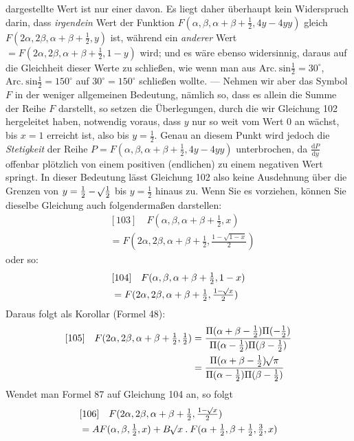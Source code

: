 dargestellte Wert ist nur einer davon. Es liegt daher überhaupt kein Widerspruch darin, dass \textit{irgendein} Wert der Funktion $F(\alpha,\beta,\alpha+\beta+\frac12,4y-4yy)$ gleich $F(2\alpha,2\beta,\alpha+\beta+\frac12,y)$ ist, während ein \textit{anderer} Wert $=F(2\alpha,2\beta,\alpha+\beta+\frac12,1-y)$ wird; und es wäre ebenso widersinnig, daraus auf die Gleichheit dieser Werte zu schließen, wie wenn man aus $\mathrm{Arc.\ sin}\frac12=30^\circ$, $\mathrm{Arc.\ sin}\frac12=150^\circ$ auf $30^\circ=150^\circ$ schließen wollte. --- Nehmen wir aber das Symbol $F$ in der weniger allgemeinen Bedeutung, nämlich so, dass es allein die Summe der Reihe $F$ darstellt, so setzen die Überlegungen, durch die wir Gleichung 102 hergeleitet haben, notwendig voraus, dass $y$ nur so weit vom Wert 0 an wächst, bis $x=1$ erreicht ist, also bis $y=\frac12$. Genau an diesem Punkt wird jedoch die \textit{Stetigkeit} der Reihe $P=F(\alpha,\beta,\alpha+\beta+\frac12,4y-4yy)$ unterbrochen, da $\frac{\mathrm dP}{\mathrm dy}$ offenbar plötzlich von einem positiven (endlichen) zu einem negativen Wert springt. 
In dieser Bedeutung lässt Gleichung 102 also keine Ausdehnung über die Grenzen von $y=\frac12-\mathord{{}^{}\!\surd}\frac12$ bis $y=\frac12$ hinaus zu. Wenn Sie es vorziehen, können Sie dieselbe Gleichung auch folgendermaßen darstellen:
\[
\begin{aligned}&[103]\quad F(\alpha,\beta,\alpha+\beta+\tfrac12,x)\\&=F(2\alpha,2\beta,\alpha+\beta+\tfrac12,\tfrac{1-\sqrt{1-x}}2)\end{aligned}
\]
oder so:
\[
\begin{aligned}&[104]\quad F(\alpha,\beta,\alpha+\beta+\tfrac12,1-x)\\&=F(2\alpha,2\beta,\alpha+\beta+\tfrac12,\tfrac{1-\mathord{{}^{}\!\surd}x}2)\end{aligned}
\]
Daraus folgt als Korollar (Formel 48):
\[
\begin{aligned}
{}[105]\quad F(2\alpha,2\beta,\alpha+\beta+\tfrac12,\tfrac12)&=\frac{\Pi(\alpha+\beta-\tfrac12)\Pi(-\tfrac12)}{\Pi(\alpha-\tfrac12)\Pi(\beta-\tfrac12)}\\
&=\frac{\Pi(\alpha+\beta-\tfrac12)\mathord{{}^{}\!\surd}\pi}{\Pi(\alpha-\tfrac12)\Pi(\beta-\tfrac12)}
\end{aligned}
\]
Wendet man Formel 87 auf Gleichung 104 an, so folgt
\[
\begin{aligned}&[106]\quad F(2\alpha,2\beta,\alpha+\beta+\tfrac12,\tfrac{1-\mathord{{}^{}\!\surd}x}2)\\&=AF(\alpha,\beta,\tfrac12,x)+B\mathord{{}^{}\!\surd}x\mathbin{.}F(\alpha+\tfrac12,\beta+\tfrac12,\tfrac32,x)\end{aligned}
\]
